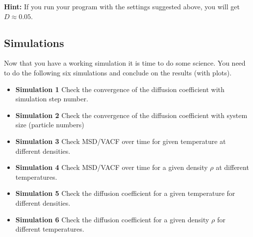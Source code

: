 \documentclass{article}
\begin{document}
\textbf{Hint:} If you run your program with the settings suggested above, you will get $D \approx 0.05$.


\clearpage
\newpage
\subsection{Simulations}

Now that you have a working simulation it is time to do
some science.
You need to do the following six simulations and conclude
on the results (with plots).

\begin{itemize}
    \item {\bf Simulation 1}\newline
    Check the convergence of the diffusion coefficient
    with simulation step number.

    \item {\bf Simulation 2}\newline
    Check the convergence of the diffusion coefficient
    with system size (particle numbers)

    \item {\bf Simulation 3}\newline
    Check MSD/VACF over time for given temperature at different densities.

    \item {\bf Simulation 4}\newline
    Check MSD/VACF over time for a given density $\rho$ at different temperatures.

    \item {\bf Simulation 5}\newline
    Check the diffusion coefficient for a given temperature for different densities.

    \item {\bf Simulation 6}\newline
    Check the diffusion coefficient for a given density $\rho$ for different temperatures.

\end{itemize}



\end{document}
